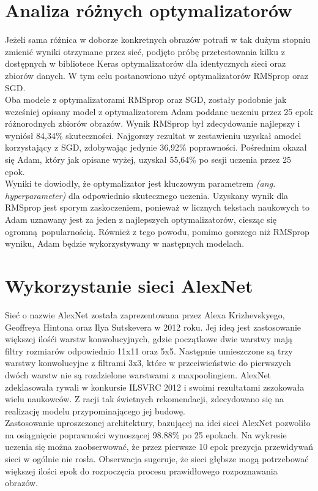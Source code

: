 \section{Analiza różnych optymalizatorów}
Jeżeli sama różnica w doborze konkretnych obrazów potrafi w tak dużym stopniu zmienić wyniki
otrzymane przez sieć, podjęto próbę przetestowania kilku z dostępnych w bibliotece Keras
optymalizatorów dla identycznych sieci oraz zbiorów danych. W tym celu postanowiono użyć
optymalizatorów RMSprop oraz SGD.\\
Oba modele z optymalizatorami RMSprop oraz SGD, zostały podobnie jak wcześniej opisany model
z optymalizatorem Adam poddane uczeniu przez 25 epok różnorodnych zbiorów obrazów. Wynik RMSprop
był zdecydowanie najlepszy i wyniósł 84,34\% skuteczności. Najgorszy rezultat w zestawieniu
uzyskał amodel korzystający z SGD, zdobywając jedynie 36,92\% poprawności. Pośrednim okazał
się Adam, który jak opisane wyżej, uzyskał 55,64\% po sesji uczenia przez 25 epok.\\
Wyniki te dowiodły, że optymalizator jest kluczowym parametrem \textit{(ang. hyperparameter)}
dla odpowiednio skutecznego uczenia. Uzyskany wynik dla RMSprop jest sporym zaskoczeniem,
ponieważ w licznych tekstach naukowych to Adam uznawany jest za jeden z najlepszych
optymalizatorów, ciesząc się ogromną popularnością. Również z tego powodu, pomimo
gorszego niż RMSprop wyniku, Adam będzie wykorzystywany w następnych modelach.

\section{Wykorzystanie sieci AlexNet}
Sieć o nazwie AlexNet została zaprezentowana przez Alexa Krizhevskyego, Geoffreya Hintona oraz
Ilya Sutskevera w 2012 roku. Jej ideą jest zastosowanie większej ilośći warstw konwolucyjnych,
gdzie początkowe dwie warstwy mają filtry rozmiarów odpowiednio 11x11 oraz 5x5. Następnie
umieszczone są trzy warstwy konwolucyjne z filtrami 3x3, które w przeciwieństwie do pierwszych
dwóch warstw nie są rozdzielone warstwami z maxpoolingiem. AlexNet zdeklasowała rywali
w konkursie ILSVRC 2012 i swoimi rezultatami zszokowała wielu naukowców. Z racji tak świetnych
rekomendacji, zdecydowano się na realizację modelu przypominającego jej budowę.\\
Zastosowanie uproszczonej architektury, bazującej na idei sieci AlexNet pozwoliło
na osiągnięcie poprawności wynoszącej 98.88\% po 25 epokach. Na wykresie uczenia się
można zaobserwować, że przez pierwsze 10 epok prezycja przewidywań sieci w ogólnie nie
rosła. Obserwacja sugeruje, że sieci głębsze mogą potrzebować większej ilości epok
do rozpoczęcia procesu prawidłowego rozpoznawania obrazów.

